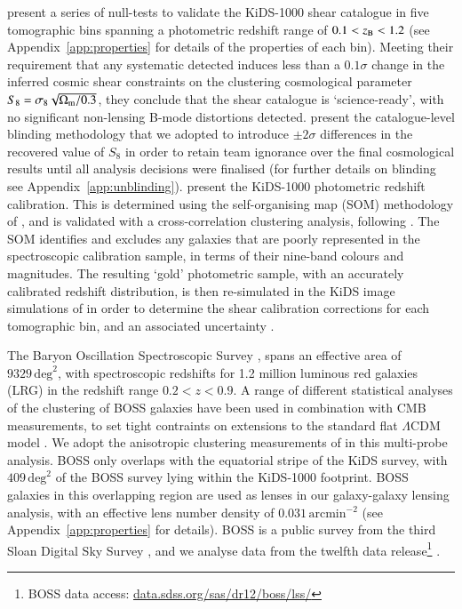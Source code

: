 \citet{giblin/etal:inprep} present a series of null-tests to validate the KiDS-1000 shear catalogue in five tomographic bins spanning a 
photometric redshift range of $0.1 < z_{\rm B} < 1.2$ (see Appendix~\ref{app:properties} for details of the properties of each bin).  
Meeting their requirement that any systematic detected induces less than a $0.1\sigma$ change in the inferred 
cosmic shear constraints on the clustering cosmological parameter $S_8 = \sigma_8\sqrt{\Omega_{\rm m}/0.3}$, they conclude that the shear catalogue is `science-ready', with no significant non-lensing B-mode distortions detected.  \citet{kuijken/etal:2015} present the catalogue-level blinding methodology that we adopted to introduce $\pm 2\sigma$ differences in the recovered value of $S_8$ in order
to retain team ignorance over the final cosmological results until all 
analysis decisions were finalised (for further details on blinding see Appendix~\ref{app:unblinding}).
\citet{hildebrandt/etal:inprep} present the KiDS-1000 photometric redshift calibration.  This is determined using the self-organising map (SOM) methodology of \citet{wright/etal:2020}, and is validated with a cross-correlation clustering analysis, following \citet{vandenbusch/etal:2020}.
The SOM identifies and excludes any galaxies that are poorly represented in the spectroscopic calibration sample, in terms of their nine-band colours and magnitudes. The resulting `gold' photometric sample, with an accurately calibrated redshift distribution, is then re-simulated in the KiDS image simulations of \citet{kannawadi/etal:2019} in order to determine the shear calibration corrections for each tomographic bin, and an associated uncertainty \citep[see][for full details]{giblin/etal:inprep,hildebrandt/etal:inprep}.
 
The Baryon Oscillation Spectroscopic Survey
\citep[BOSS,][]{alam/etal:2015}, spans an effective area of $9329\,\mathrm{deg}^{2}$, with spectroscopic redshifts for 1.2 million luminous red
galaxies (LRG) in the redshift range $0.2<z<0.9$.   A range of
different statistical analyses of the clustering of BOSS galaxies have been used in combination with CMB
measurements, to set tight contraints on extensions to the standard
flat $\Lambda$CDM model \citep[see][and references
therein]{alam/etal:2017}.   We adopt the anisotropic clustering
measurements of \citet{sanchez/etal:2017} in this multi-probe analysis.
BOSS only overlaps with the equatorial stripe
of the KiDS survey, with $409\,\mathrm{deg}^{2}$ of the BOSS survey lying within
the KiDS-1000 footprint.  BOSS galaxies in this overlapping region are used as lenses in
our galaxy-galaxy lensing analysis, with an effective lens number density of $0.031\,\mathrm{arcmin}^{-2}$ (see Appendix~\ref{app:properties} for details).  BOSS is a public survey from the third Sloan
Digital Sky Survey \citep{york/etal:2000}, and we analyse data from the twelfth data release\footnote{BOSS data access: \href{https://data.sdss.org/sas/dr12/boss/lss/}{data.sdss.org/sas/dr12/boss/lss/}} \citep[DR12,][]{alam/etal:2015}. 

